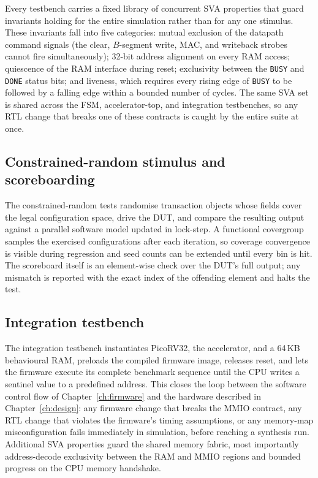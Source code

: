 Every testbench carries a fixed library of concurrent SVA properties
that guard invariants holding for the entire simulation rather than for
any one stimulus. These invariants fall into five categories: mutual
exclusion of the datapath command signals (the clear, $B$-segment write,
MAC, and writeback strobes cannot fire simultaneously); 32-bit address
alignment on every RAM access; quiescence of the RAM interface during
reset; exclusivity between the \texttt{BUSY} and \texttt{DONE} status
bits; and liveness, which requires every rising edge of \texttt{BUSY}
to be followed by a falling edge within a bounded number of cycles. The
same SVA set is shared across the FSM, accelerator-top, and integration
testbenches, so any RTL change that breaks one of these contracts is
caught by the entire suite at once.

\subsection{Constrained-random stimulus and scoreboarding}

The constrained-random tests randomise transaction objects whose fields
cover the legal configuration space, drive the DUT, and compare the
resulting output against a parallel software model updated in lock-step.
A functional covergroup samples the exercised configurations after each
iteration, so coverage convergence is visible during regression and
seed counts can be extended until every bin is hit. The scoreboard
itself is an element-wise check over the DUT's full output; any
mismatch is reported with the exact index of the offending element and
halts the test.

\subsection{Integration testbench}

The integration testbench instantiates PicoRV32, the accelerator, and a
64\,KB behavioural RAM, preloads the compiled firmware image, releases
reset, and lets the firmware execute its complete benchmark sequence
until the CPU writes a sentinel value to a predefined address. This
closes the loop between the software control flow of
Chapter~\ref{ch:firmware} and the hardware described in
Chapter~\ref{ch:design}: any firmware change that breaks the MMIO
contract, any RTL change that violates the firmware's timing
assumptions, or any memory-map misconfiguration fails immediately in
simulation, before reaching a synthesis run. Additional SVA properties
guard the shared memory fabric, most importantly address-decode
exclusivity between the RAM and MMIO regions and bounded progress on
the CPU memory handshake.

